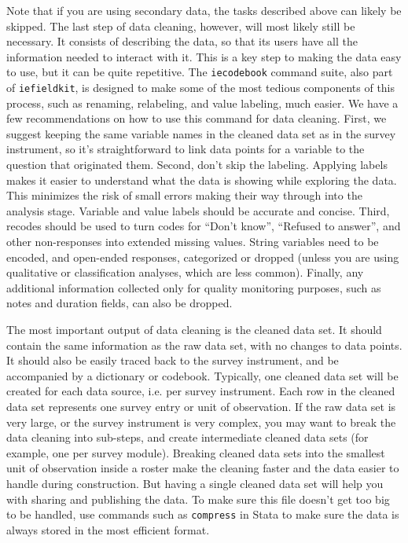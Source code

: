 Note that if you are using secondary data, the tasks described above can likely be skipped.
The last step of data cleaning, however, will most likely still be necessary.
It consists of describing the data, so that its users have all the information needed to interact with it.
This is a key step to making the data easy to use, but it can be quite repetitive.
The \texttt{iecodebook} command suite, also part of \texttt{iefieldkit},
is designed to make some of the most tedious components of this process,
such as renaming, relabeling, and value labeling, much easier.
We have a few recommendations on how to use this command for data cleaning.
First, we suggest keeping the same variable names in the cleaned data set as in the survey instrument, so it's straightforward to link data points for a variable to the question that originated them.
Second, don't skip the labeling.
Applying labels makes it easier to understand what the data is showing while exploring the data. 
This minimizes the risk of small errors making their way through into the analysis stage.
Variable and value labels should be accurate and concise.
Third, recodes should be used to turn codes for ``Don't know'', ``Refused to answer'', and
other non-responses into extended missing values.
String variables need to be encoded, and open-ended responses, categorized or dropped
(unless you are using qualitative or classification analyses, which are less common).
Finally, any additional information collected only for quality monitoring purposes,
such as notes and duration fields, can also be dropped.


The most important output of data cleaning is the cleaned data set. 
It should contain the same information as the raw data set,
with no changes to data points.
It should also be easily traced back to the survey instrument,
and be accompanied by a dictionary or codebook.
Typically, one cleaned data set will be created for each data source,
i.e. per survey instrument.
Each row in the cleaned data set represents one survey entry or unit of observation.
If the raw data set is very large, or the survey instrument is very complex,
you may want to break the data cleaning into sub-steps, 
and create intermediate cleaned data sets
(for example, one per survey module).
Breaking cleaned data sets into the smallest unit of observation inside a roster
make the cleaning faster and the data easier to handle during construction.
But having a single cleaned data set will help you with sharing and publishing the data.
To make sure this file doesn't get too big to be handled,
use commands such as \texttt{compress} in Stata to make sure the data
is always stored in the most efficient format.

